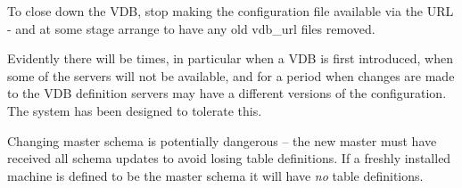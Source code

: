 To close down the VDB, stop making the configuration file available
via the URL - and at some stage arrange to have any old vdb\_url files
removed.

Evidently there will be times, in particular when a VDB is first
introduced, when some of the servers will not be available, and for a
period when changes are made to the VDB definition servers may have a
different versions of the configuration. The system has been designed
to tolerate this.

Changing master schema is potentially dangerous {--} the new master
must have received all schema updates to avoid losing table
definitions. If a freshly installed machine is defined to be the
master schema it will have \textit{no} table definitions.
